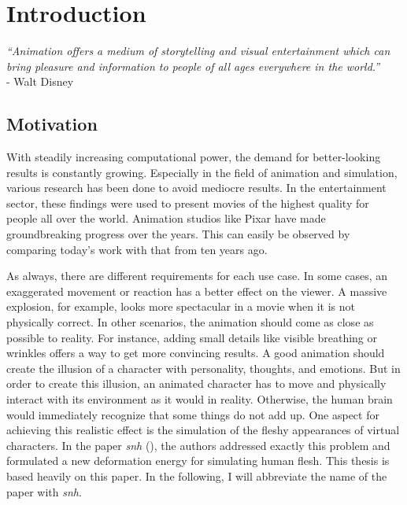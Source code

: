 \chapter{Introduction}
\label{c:Introduction}
\textit{``Animation offers a medium of storytelling and visual entertainment which can bring pleasure and information to people of all ages everywhere in the world.''} \\
- Walt Disney

\section{Motivation}
With steadily increasing computational power, the demand for better-looking results is constantly growing. Especially in the field of animation and simulation, various research has been done to avoid mediocre results. In the entertainment sector, these findings were used to present movies of the highest quality for people all over the world. Animation studios like Pixar\textsuperscript{\textcopyright} have made groundbreaking progress over the years. This can easily be observed by comparing today's work with that from ten years ago. 

As always, there are different requirements for each use case. In some cases, an exaggerated movement or reaction has a better effect on the viewer. A massive explosion, for example, looks more spectacular in a movie when it is not physically correct. In other scenarios, the animation should come as close as possible to reality. For instance, adding small details like visible breathing or wrinkles offers a way to get more convincing results. A good animation should create the illusion of a character with personality, thoughts, and emotions. But in order to create this illusion, an animated character has to move and physically interact with its environment as it would in reality. Otherwise, the human brain would immediately recognize that some things do not add up. One aspect for achieving this realistic effect is the simulation of the fleshy appearances of virtual characters. In the paper \textit{\acrlong{snh}} (\cite{Smith:2018:SNF:3191713.3180491}), the authors addressed exactly this problem and formulated a new deformation energy for simulating human flesh. This thesis is based heavily on this paper. In the following, I will abbreviate the name of the paper with \textit{\acrshort{snh}}.

